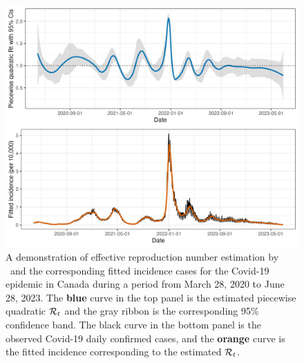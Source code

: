 \begin{figure}[tb]
    \centering
    \includegraphics[width=.9\textwidth]{fig/intro-fig-new.png}
    \caption{A demonstration of effective reproduction number estimation 
    by \RtEstim\ and the corresponding fitted incidence cases for the Covid-19 epidemic 
    in Canada during a period from March 28, 2020 to June 28, 2023. 
    The \textcolor{customblue}{\textbf{blue}} curve in the top panel is the estimated piecewise
    quadratic $\mathcal{R}_t$ and the gray ribbon is the corresponding 95\% confidence band. 
    The black curve in the bottom panel is the observed Covid-19 daily confirmed 
    cases, and the \textcolor{customorange}{\textbf{orange}} curve is the fitted incidence 
    corresponding to the estimated $\mathcal{R}_t$.}
    \label{fig:intro-fig}
\end{figure}

